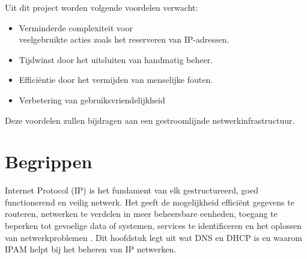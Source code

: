 \documentclass{hogent-article}
\begin{document}
Uit dit project worden volgende voordelen verwacht:
\begin{itemize}
    \item Verminderde complexiteit voor \\veelgebruikte acties zoals het reserveren van IP-adressen.
    \item Tijdwinst door het uitsluiten van handmatig beheer.
    \item Efficiëntie door het vermijden van menselijke fouten.
    \item Verbetering van gebruiksvriendelijkheid
\end{itemize}
Deze voordelen zullen bijdragen aan een gestroomlijnde netwerkinfrastructuur.



\section{Begrippen}
\label{sec:begrippen}
Internet Protocol (IP) is het fundament van elk gestructureerd, goed functionerend en veilig netwerk. Het geeft de mogelijkheid efficiënt gegevens te routeren, netwerken te verdelen in meer beheersbare eenheden, toegang te beperken tot gevoelige data of systemen, services te identificeren en het oplossen van netwerkproblemen \autocite{Postel1981}. Dit hoofdstuk legt uit wat DNS en DHCP is en waarom IPAM helpt bij het beheren van IP netwerken. 
\end{document}
